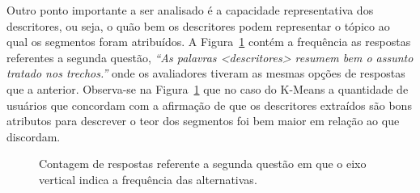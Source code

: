 Outro ponto importante a ser analisado é a capacidade representativa dos descritores, ou seja, o quão bem os descritores podem representar o tópico ao qual os segmentos foram atribuídos. A Figura~\ref{fig:Q2} contém a frequência as respostas referentes a segunda questão, \textit{``As palavras \textit{<descritores>} resumem bem o assunto tratado nos trechos.''} onde os avaliadores tiveram as mesmas opções de respostas que a anterior. Observa-se na Figura~\ref{fig:Q2} que no caso do K-Means a quantidade de usuários que concordam com a afirmação de que os descritores extraídos são bons atributos para descrever o teor dos segmentos foi bem maior em relação ao que discordam.

\begin{figure}[!h] \centering     %

	\caption{Contagem de respostas referente a segunda questão em que o eixo vertical indica a frequência das alternativas.  }
	\label{fig:Q2}
\end{figure}


